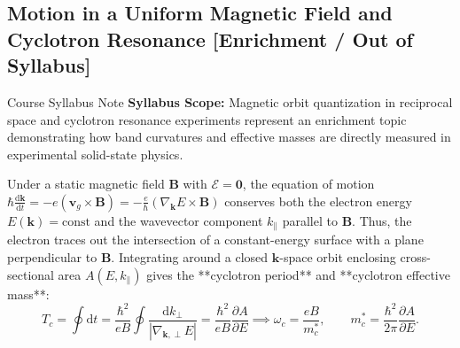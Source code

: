 \documentclass[11pt,a4paper]{article}
\newcommand{\abs}[1]{\left|#1\right|}
\newcommand{\dv}[2]{\frac{\mathrm{d}#1}{\mathrm{d}#2}}
\newcommand{\vb}[1]{\mathbf{#1}}
\newcommand{\hb}{\hbar}
\newcommand{\hbarsq}{\hb^2}
\newcommand{\dd}{\mathrm{d}}
\newcommand{\kk}{\mathbf{k}}
\begin{document}
\subsection{Motion in a Uniform Magnetic Field and Cyclotron Resonance \texorpdfstring{{\normalfont\normalsize\color{purple!75!black}\textbf{[Enrichment / Out of Syllabus]}}}{[Enrichment / Out of Syllabus]}}

\begin{enrichmentbox}{Course Syllabus Note}
\textbf{Syllabus Scope:} Magnetic orbit quantization in reciprocal space and cyclotron resonance experiments represent an enrichment topic demonstrating how band curvatures and effective masses are directly measured in experimental solid-state physics.
\end{enrichmentbox}

Under a static magnetic field $\vb{B}$ with $\bm{\mathcal{E}} = \vb{0}$, the equation of motion $\hb\dv{\kk}{t} = -e(\vb{v}_g\times\vb{B}) = -\frac{e}{\hb}(\nabla_{\kk}E \times \vb{B})$ conserves both the electron energy $E(\kk) = \text{const}$ and the wavevector component $k_\parallel$ parallel to $\vb{B}$. Thus, the electron traces out the intersection of a constant-energy surface with a plane perpendicular to $\vb{B}$. Integrating around a closed $\kk$-space orbit enclosing cross-sectional area $A(E, k_\parallel)$ gives the **cyclotron period** and **cyclotron effective mass**:
\begin{equation}
    T_c = \oint \dd t = \frac{\hbarsq}{eB}\oint \frac{\dd k_\perp}{\abs{\nabla_{\kk,\perp}E}} = \frac{\hbarsq}{eB}\frac{\partial A}{\partial E} \implies \boxed{\omega_c = \frac{eB}{m_c^*}, \qquad m_c^* = \frac{\hbarsq}{2\pi}\frac{\partial A}{\partial E}.}
\end{equation}
\end{document}
